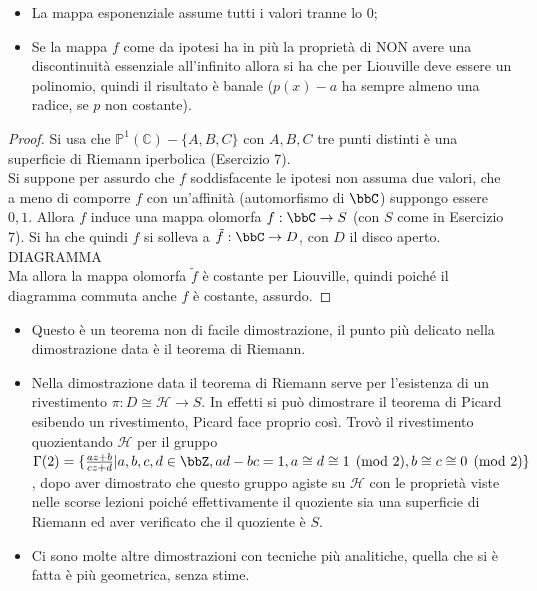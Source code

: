 \begin{osservazione}
\begin{itemize}
\item La mappa esponenziale assume tutti i valori tranne lo $0$;
\item Se la mappa $f$ come da ipotesi ha in più la proprietà di NON avere una discontinuità essenziale all'infinito allora si ha che per Liouville deve essere un polinomio, quindi il risultato è banale ($p(x)-a$ ha sempre almeno una radice, se $p$ non costante).
\end{itemize}
\end{osservazione}


\begin{proof}
Si usa che $\mathbb{P}^1(\mathbb{C})\minus\{ A, B, C\}$ con $A, B, C$ tre punti distinti è una superficie di Riemann iperbolica (Esercizio 7).\\
Si suppone per assurdo che $f$ soddisfacente le ipotesi non assuma due valori, che a meno di comporre $f$ con un'affinità (automorfismo di $\bbC$) suppongo essere $0,1$.
Allora $f$ induce una mappa olomorfa $f:\bbC \rightarrow S$ (con $S$ come in Esercizio 7).
Si ha che quindi $f$ si solleva a $\tilde{f}:\bbC\rightarrow D$, con $D$ il disco aperto. DIAGRAMMA \\
Ma allora la mappa olomorfa $\tilde{f}$ è costante per Liouville, quindi poiché il diagramma commuta anche $f$ è costante, assurdo.
\end{proof}

\begin{osservazione}
\begin{itemize}
\item Questo è un teorema non di facile dimostrazione, il punto più delicato nella dimostrazione data è il teorema di Riemann.
\item Nella dimostrazione data il teorema di Riemann serve per l'esistenza di un rivestimento $\pi:D\cong \mathcal{H} \rightarrow S$. In effetti si può dimostrare il teorema di Picard esibendo un rivestimento, Picard face proprio così. Trovò il rivestimento quozientando $\mathcal{H}$ per il gruppo $\Gamma(2)=\{ \frac{az+b}{cz+d} | a,b,c,d\in \bbZ, ad-bc=1, a\cong d \cong 1 \pmod{2}, b\cong c \cong 0 \pmod{2} \}$, dopo aver dimostrato che questo gruppo agiste su $\mathcal{H}$ con le proprietà viste nelle scorse lezioni poiché effettivamente il quoziente sia una superficie di Riemann ed aver verificato che il quoziente è $S$.
\item Ci sono molte altre dimostrazioni con tecniche più analitiche, quella che si è fatta è più geometrica, senza stime.
\end{itemize}
\end{osservazione}

